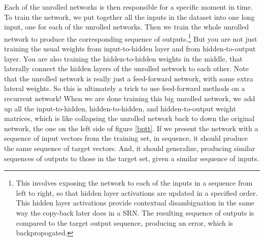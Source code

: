 
Each of the unrolled networks is then responsible for a specific moment in time. To train the network, we put together all the inputs in the dataset into one long input, one for each of the unrolled networks. Then we train the whole unrolled network to produce the corresponding sequence of outputs.\footnote{This involves exposing the network to each of the inputs in a sequence from left to right, so that hidden layer activations are updated in a specified order. This hidden layer activations provide contextual disambiguation in the same way the copy-back later does in a SRN. The resulting sequence of outputs is compared to the target output sequence, producing an error, which is backpropogated.} But you are not just training the usual weights from input-to-hidden layer and from hidden-to-output layer. You are also training the hidden-to-hidden weights in the middle, that laterally connect the hidden layers  of the unrolled network to each other. Note that the unrolled network is really just a feed-forward network, with some extra lateral weights. So this is ultimately a trick to use feed-forward methods on a recurrent network! When we are done training this big unrolled network, we add up all the input-to-hidden, hidden-to-hidden, and hidden-to-output weight matrices, which is like collapsing the unrolled network back to down the original network, the one on the left side of figure \ref{bptt}. If we present the network with a sequence of input vectors from the training set, in sequence, it should produce the same sequence of target vectors. And, it should generalize, producing similar sequences of outputs to those in the target set, given a similar sequence of inputs. 


